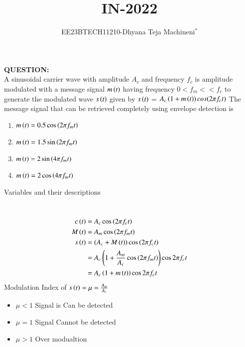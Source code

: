\documentclass[journal,12pt,twocolumn]{IEEEtran}
\theoremstyle{remark}
\begin{document}

\vspace{3cm}
\title{\textbf{IN-2022}}
\author{EE23BTECH11210-Dhyana Teja Machineni$^{*}$%
}
\maketitle
\newpage
\bigskip

\textbf{QUESTION:}\\
A sinusoidal carrier wave with amplitude $A_c$ and frequency $f_c$ is amplitude modulated with a message signal $m\left(t\right)$ having frequency $0 < f_m << f_c$ to generate the modulated wave $s\left(t\right)$ given by
$s\left(t\right)$ = $A_c\left(1 + m\left(t\right)\right)cos (2\pi f_c t)$
The message signal that can be retrieved completely using
envelope detection is \underline{{\hspace{1.5in}}}
\begin{enumerate}
    \item $m\left(t\right)= 0.5 \cos{\ensuremath{\left(2 \pi f_m t\right)}}$
    \item $m\left(t\right)= 1.5 \sin{\ensuremath{\left(2 \pi f_m t\right)}}$
    \item $m\left(t\right)= 2 \sin{\ensuremath{\left(4 \pi f_m t\right)}}$
    \item $m\left(t\right)= 2 \cos{\ensuremath{\left(4 \pi f_m t\right)}}$
\end{enumerate}
\solution
\begin{table}[h]
         \label{tab:table}
         
         \caption{Variables and their descriptions}
     \end{table}\\
\begin{align}
c\left(t\right)&=A_c \cos\left(2 \pi f_c t\right)\\
   M\left(t\right)&= A_m \cos\left(2 \pi f_m t\right)\\
    s\left(t\right)&= \left(A_c+ M\left(t\right)\right) \cos\left(2\pi f_c t\right)\\
    &=A_c\left(1+\frac{A_m}{A_c} \cos\left(2 \pi f_m t\right)\right)\cos{2 \pi f_c t}\\
    &=A_c\left(1+m\left(t\right)\right)\cos{2 \pi f_c t}
\end{align}
Modulation Index of $s\left(t\right)=\mu= \frac{A_m}{A_c}$
\begin{itemize}
    \item $\mu<1$  Signal is Can be detected
    \item $\mu=1$   Signal Cannot be detected
    \item $\mu>1$   Over modualtion 
\end{itemize}
\end{document}

